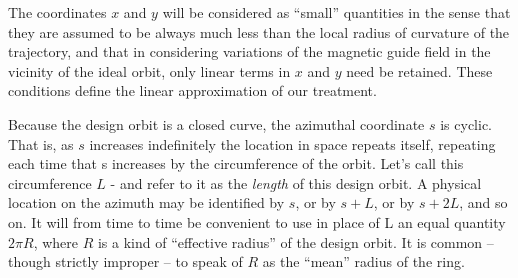 The coordinates $x$ and $y$ will be considered as “small” quantities in the sense that they are assumed to be always much less than the local radius of curvature of the trajectory, and that in considering variations of the magnetic guide field in the vicinity of the ideal orbit, only linear terms in $x$ and $y$ need be retained. These conditions define the linear approximation of our treatment.

Because the design orbit is a closed curve, the azimuthal coordinate $s$ is cyclic. That is, as $s$ increases indefinitely the location in space repeats itself, repeating each time that s increases by the circumference of the orbit. Let’s call this circumference $L$ - and refer to it as the \textit{length} of this design orbit. A physical location on the azimuth may be identified by $s$, or by $s + L$, or by $s + 2L$, and so on. It will from time to time be convenient to use in place of L an equal quantity $2\pi R$, where $R$ is a kind of “effective radius” of the design orbit. It is common -- though strictly improper -- to speak of $R$ as the “mean” radius of the ring.

